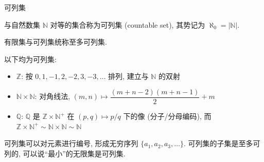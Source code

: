 \begin{frame}{可列集}

\begin{Def}[可列集]
与自然数集 $\mathbb{N}$ 对等的集合称为\alert{可列集} (countable set), 其势记为 $\aleph_0 = |\mathbb{N}|$.

有限集与可列集统称\alert{至多可列集}.
\end{Def}

\pause
\vspace{0.3em}

\begin{eg}
以下均为可列集:
\begin{itemize}
\item $\mathbb{Z}$: 按 $0, 1, -1, 2, -2, 3, -3, \ldots$ 排列, 建立与 $\mathbb{N}$ 的双射
\item $\mathbb{N} \times \mathbb{N}$: \alert{对角线法}, $(m, n) \mapsto \dfrac{(m+n-2)(m+n-1)}{2} + m$
\item $\mathbb{Q}$: $\mathbb{Q}$ 是 $\mathbb{Z} \times \mathbb{N}^+$ 在 $(p,q) \mapsto p/q$ 下的像 (分子/分母编码), 而 $\mathbb{Z} \times \mathbb{N}^+ \sim \mathbb{N} \times \mathbb{N} \sim \mathbb{N}$
\end{itemize}
\end{eg}

\pause
\vspace{0.3em}

\begin{remark}
可列集可以对元素进行编号, 形成无穷序列 $\{a_1, a_2, a_3, \ldots\}$. 可列集的子集是至多可列的, 可以说``最小''的无限集是可列集.
\end{remark}

\end{frame}


